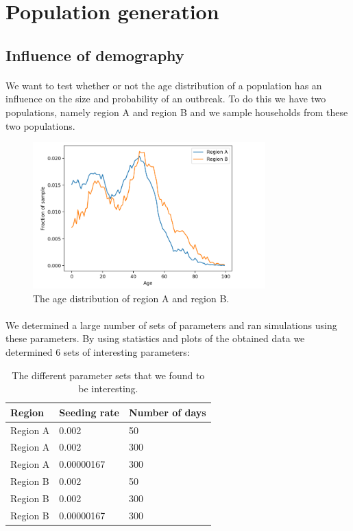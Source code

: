\documentclass[runningheads]{llncs}
\begin{document}
\section{Population generation}

\subsection{Influence of demography}

\paragraph{} We want to test whether or not the age distribution of a population has an influence on the size and probability of an outbreak. To do this we have two populations, namely region A and region B and we sample households from these two populations. 

\begin{figure}[H]
\centering
\includegraphics[width=0.8\textwidth]{./2_1_regionDiff/plot_ageDistr.png}
\caption{The age distribution of region A and region B.}
\label{2_1_regionDiff_plotAgeDistr}
\end{figure}

\paragraph{} We determined a large number of sets of parameters and ran simulations using these parameters. By using statistics and plots of the obtained data we determined 6 sets of interesting parameters:

\begin{table}[H]
\centering
\begin{tabular}{|l|l|l|}
\hline
\textbf{Region} & \textbf{Seeding rate} & \textbf{Number of days} \\
\hline
Region A & 0.002      & 50 \\
\hline
Region A & 0.002      & 300 \\
\hline
Region A & 0.00000167 & 300 \\
\hline
Region B & 0.002      & 50 \\
\hline
Region B & 0.002      & 300 \\
\hline
Region B & 0.00000167 & 300 \\
\hline
\end{tabular}
\caption{The different parameter sets that we found to be interesting.}
\label{2_1_regionDiff_tableParamSets}
\end{table}
\end{document}
